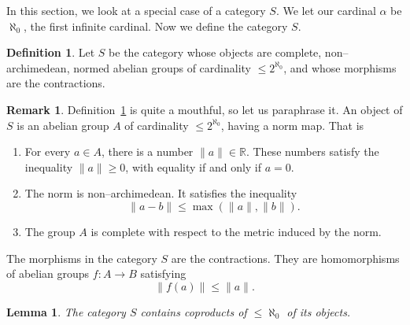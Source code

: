 \documentclass[11pt,a4paper]{article}
\theoremstyle{plain}
\newtheorem{lemma}[theorem]{Lemma}
\theoremstyle{definition}
\newtheorem{definition}[theorem]{Definition}
\newtheorem{remark}[theorem]{Remark}
\numberwithin{equation}{section}
\begin{document}
In this section, we look at a special case of a category $S$. We let our cardinal $\alpha$ be $\aleph_{0}$, the first infinite cardinal. Now we define the category $S$.

\begin{definition}\label{def3.1}
Let $S$ be the category whose objects are complete, non--archimedean, normed abelian groups of cardinality $\leq 2^{\aleph_{0}}$, and whose morphisms are the contractions.
\end{definition}

\begin{remark}\label{rem3.2}
Definition~\ref{def3.1} is quite a mouthful, so let us paraphrase it. An object of $S$ is an abelian group $A$ of cardinality $\leq 2^{\aleph_{0}}$, having a norm map. That is
\begin{enumerate}[label=3.2.\arabic*]
\item For every $a \in A$, there is a number $\|a\| \in \mathbb{R}$. These numbers satisfy the inequality $\|a\| \geq 0$, with equality if and only if $a = 0$.
\item The norm is non--archimedean. It satisfies the inequality
\begin{equation*}
\|a-b\| \leq \max(\|a\|,\|b\|).
\end{equation*}
\item The group $A$ is complete with respect to the metric induced by the norm.
\end{enumerate}
The morphisms in the category $S$ are the contractions. They are homomorphisms of abelian groups $f: A \to B$ satisfying
\begin{equation*}
\|f(a)\| \leq \|a\|.
\end{equation*}
\end{remark}

\begin{lemma}\label{lem3.3}
The category $S$ contains coproducts of $\leq\aleph_{0}$ of its objects.
\end{lemma}
\end{document}
